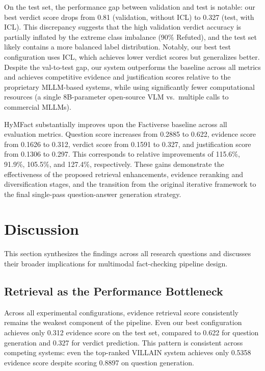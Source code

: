On the test set, the performance gap between validation and test is notable: our best verdict score drops from 0.81 (validation, without ICL) to 0.327 (test, with ICL). This discrepancy suggests that the high validation verdict accuracy is partially inflated by the extreme class imbalance (90\% Refuted), and the test set likely contains a more balanced label distribution. Notably, our best test configuration uses ICL, which achieves lower verdict scores but generalizes better. Despite the val-to-test gap, our system outperforms the baseline across all metrics and achieves competitive evidence and justification scores relative to the proprietary MLLM-based systems, while using significantly fewer computational resources (a single 8B-parameter open-source VLM vs.\ multiple calls to commercial MLLMs).

HyMFact substantially improves upon the Factiverse baseline across all evaluation metrics. Question score increases from 0.2885 to 0.622, evidence score from 0.1626 to 0.312, verdict score from 0.1591 to 0.327, and justification score from 0.1306 to 0.297. This corresponds to relative improvements of 115.6\%, 91.9\%, 105.5\%, and 127.4\%, respectively. These gains demonstrate the effectiveness of the proposed retrieval enhancements, evidence reranking and diversification stages, and the transition from the original iterative framework to the final single-pass question-answer generation strategy.

\section{Discussion}
\label{sec:discussion}

This section synthesizes the findings across all research questions and discusses their broader implications for multimodal fact-checking pipeline design.

\subsection{Retrieval as the Performance Bottleneck}

Across all experimental configurations, evidence retrieval score consistently remains the weakest component of the pipeline. Even our best configuration achieves only 0.312 evidence score on the test set, compared to 0.622 for question generation and 0.327 for verdict prediction. This pattern is consistent across competing systems: even the top-ranked VILLAIN system achieves only 0.5358 evidence score despite scoring 0.8897 on question generation.

